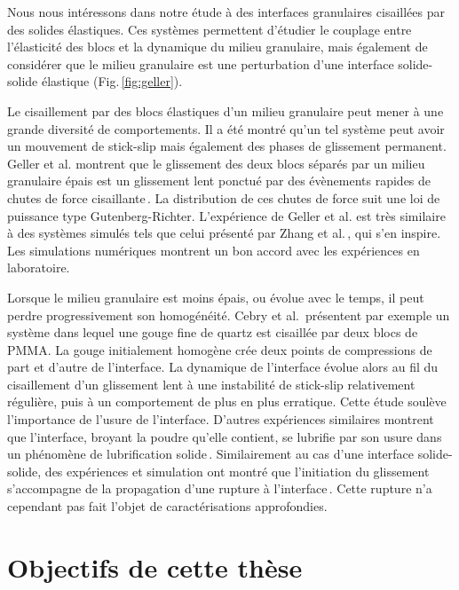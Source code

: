 Nous nous intéressons dans notre étude à des interfaces granulaires cisaillées par des solides élastiques. Ces systèmes permettent d'étudier le couplage entre l'élasticité des blocs et la dynamique du milieu granulaire, mais également de considérer que le milieu granulaire est une perturbation d'une interface solide-solide élastique (Fig.\,\ref{fig:geller}).

Le cisaillement par des blocs élastiques d'un milieu granulaire peut mener à une grande diversité de comportements. Il a été montré qu'un tel système peut avoir un mouvement de stick-slip mais également des phases de glissement permanent. Geller et al. montrent que le glissement des deux blocs séparés par un milieu granulaire épais est un glissement lent ponctué par des évènements rapides de chutes de force cisaillante\,\cite{geller_stick-slip_2015}. La distribution de ces chutes de force suit une loi de puissance type Gutenberg-Richter. L'expérience de Geller et al. est très similaire à des systèmes simulés tels que celui présenté par Zhang et al.\,\cite{zhang_two_2023}, qui s'en inspire. Les simulations numériques montrent un bon accord avec les expériences en laboratoire.

Lorsque le milieu granulaire est moins épais, ou évolue avec le temps, il peut perdre progressivement son homogénéité. Cebry et al.\,\cite{cebry_creep_2022} présentent par exemple un système dans lequel une gouge fine de quartz est cisaillée par deux blocs de PMMA. La gouge initialement homogène crée deux points de compressions de part et d'autre de l'interface. La dynamique de l'interface évolue alors au fil du cisaillement d'un glissement lent à une instabilité de stick-slip relativement régulière, puis à un comportement de plus en plus erratique. Cette étude soulève l'importance de l'usure de l'interface. D'autres expériences similaires montrent que l'interface, broyant la poudre qu'elle contient, se lubrifie par son usure dans un phénomène de lubrification solide\,\cite{reches_fault_2010}. Similairement au cas d'une interface solide-solide, des expériences et simulation ont montré que l'initiation du glissement s'accompagne de la propagation d'une rupture à l'interface\,\cite{cebry_creep_2022,buijze_nucleation_2020,buijze_effects_2021}. Cette rupture n'a cependant pas fait l'objet de caractérisations approfondies.



\section{Objectifs de cette thèse}


